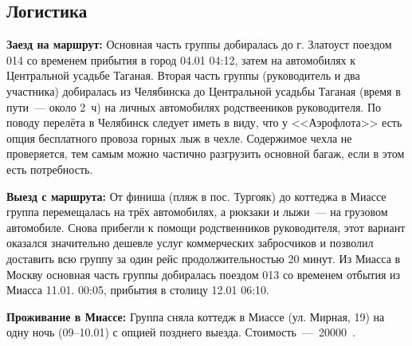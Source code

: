 \subsection{Логистика}

\textbf{Заезд на маршрут:}
Основная часть группы добиралась до г. Златоуст поездом 014 со временем прибытия в город 04.01 04:12, затем на автомобилях к Центральной усадьбе Таганая. Вторая часть группы (руководитель и два участника) добиралась из Челябинска до Центральной усадьбы Таганая (время в пути~--- около 2~ч) на личных автомобилях родствееников руководителя. По поводу перелёта в Челябинск следует иметь в виду, что у <<Аэрофлота>> есть опция бесплатного провоза горных лыж в чехле. Содержимое чехла не проверяется, тем самым можно частично разгрузить основной багаж, если в этом есть потребность.

\textbf{Выезд с маршрута: }
От финиша (пляж в пос. Тургояк) до коттеджа в Миассе группа перемещалась на трёх автомобилях, а рюкзаки и лыжи~--- на грузовом автомобиле. Снова прибегли к помощи родственников руководителя, этот вариант оказался значительно дешевле услуг коммерческих забросчиков и позволил доставить всю группу за один рейс продолжительностью 20 минут. Из Миасса в Москву основная часть группы добиралась поездом 013 со временем отбытия из Миасса 11.01. 00:05, прибытия в столицу 12.01 06:10.


\textbf{Проживание в Миассе:}
Группа сняла коттедж в Миассе (ул. Мирная, 19) на одну ночь (09--10.01) с опцией позднего выезда. Стоимость~---~20000~\faRuble.


